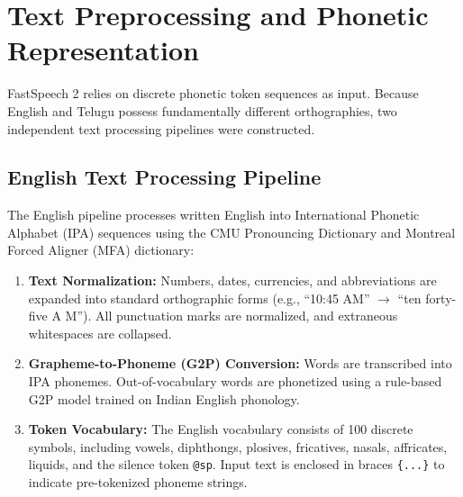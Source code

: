 \documentclass[11pt,a4paper]{article}
\begin{document}
\section{Text Preprocessing and Phonetic Representation}

FastSpeech 2 relies on discrete phonetic token sequences as input. Because English and Telugu possess fundamentally different orthographies, two independent text processing pipelines were constructed.

\subsection{English Text Processing Pipeline}
The English pipeline processes written English into International Phonetic Alphabet (IPA) sequences using the CMU Pronouncing Dictionary and Montreal Forced Aligner (MFA) dictionary:
\begin{enumerate}
    \item \textbf{Text Normalization:} Numbers, dates, currencies, and abbreviations are expanded into standard orthographic forms (e.g., ``10:45 AM'' $\to$ ``ten forty-five A M''). All punctuation marks are normalized, and extraneous whitespaces are collapsed.
    \item \textbf{Grapheme-to-Phoneme (G2P) Conversion:} Words are transcribed into IPA phonemes. Out-of-vocabulary words are phonetized using a rule-based G2P model trained on Indian English phonology.
    \item \textbf{Token Vocabulary:} The English vocabulary consists of 100 discrete symbols, including vowels, diphthongs, plosives, fricatives, nasals, affricates, liquids, and the silence token \texttt{@sp}. Input text is enclosed in braces \texttt{\{...\}} to indicate pre-tokenized phoneme strings.
\end{enumerate}
\end{document}
